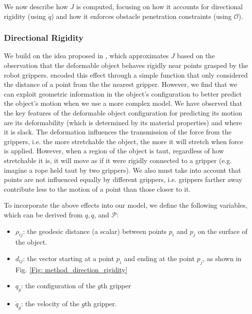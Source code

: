 We now describe how $J$ is computed, focusing on how it accounts for directional rigidity (using $\dot{q}$) and how it enforces obstacle penetration constraints (using $\mathcal{O}$).


\subsubsection{Directional Rigidity}
We build on the idea proposed in \cite{Berenson2013}, which approximates $J$ based on the observation that the deformable object behaves rigidly near points grasped by the robot grippers. \cite{Berenson2013} encoded this effect through a simple function that only considered the distance of a point from the the nearest gripper. However, we find that we can exploit geometric information in the object's configuration to better predict the object's motion when we use a more complex model. We have observed that the key features of the deformable object configuration for predicting its motion are its deformability (which is determined by its material properties) and where it is slack.  
The deformation influences the transmission of the force from the grippers, i.e. the more stretchable the object, the more it will stretch when force is applied. However, when a region of the object is taut, regardless of how stretchable it is, it will move as if it were rigidly connected to a gripper (e.g. imagine a rope held taut by two grippers). %
We also must take into account that points are not influenced equally by different grippers, i.e. grippers farther away contribute less to the motion of a point than those closer to it.


To incorporate the above effects into our model, we define the following variables, which can be derived from $q, \dot{q}$, and $\mathcal{P}$:
\begin{itemize}
    \item $\rho_{ij}$: the geodesic distance (a scalar) between points $p_i$ and $p_j$ on the surface of the object.
    \item $d_{ij}$: the vector starting at a point $p_i$ and ending at the point $p_j$, as shown in Fig. \ref{Fig: method_direction_rigidity}
    \item $q_g$: the configuration of the $g$th gripper
    \item $\dot{q}_g$: the velocity of the $g$th gripper.
\end{itemize}

